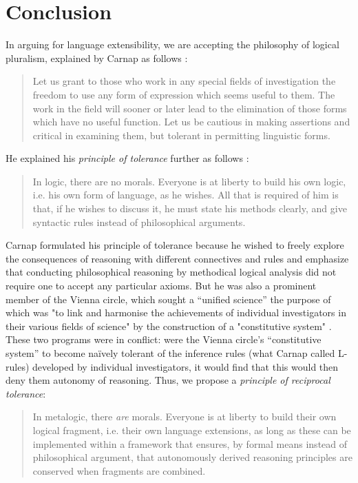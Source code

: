 \section{Conclusion}\label{conclusion}
In arguing for language extensibility, we are accepting the philosophy of logical pluralism, explained by Carnap as follows \cite{carnap:1950b}:
\begin{quote}
Let us grant to those who work in any special fields of investigation the freedom to use any form of expression which seems useful to them. The work in the field will sooner or later lead to the elimination of those forms which have no useful function. Let us be cautious in making assertions and critical in examining them, but tolerant in permitting linguistic forms.
\end{quote}
He explained his \emph{principle of tolerance} further as follows \cite{CarnapR:logsl}:
\begin{quote}
In logic, there are no morals. Everyone is at liberty to build his own logic, i.e. his own form of language, as he wishes. All that is required of him is that, if he wishes to discuss it, he must state his methods clearly, and give syntactic rules instead of philosophical arguments.
\end{quote}

Carnap formulated his principle of tolerance because he wished to freely explore the consequences of reasoning with different connectives and  rules and emphasize that conducting philosophical reasoning by methodical logical analysis did not require one to accept any particular axioms. But he was also a prominent member of the Vienna circle, which sought a ``unified science'' the purpose of which was "to link and harmonise the achievements of individual investigators in their various fields of science" by the construction of a "constitutive system" \cite{hahn1929scientific}. These two programs were in conflict: were the Vienna circle's ``constitutive system'' to become na\"ively tolerant of the inference rules (what Carnap called L-rules) developed by individual investigators, it would find that this would then deny them autonomy of reasoning.%
Thus, we propose a \emph{principle of reciprocal tolerance}:
\begin{quote}
In metalogic, there \emph{are} morals. Everyone is at liberty to build their own logical fragment, i.e. their own language extensions, as long as these can be implemented within a framework that ensures, by formal means instead of philosophical argument, that autonomously derived reasoning principles are conserved when fragments are combined.
\end{quote}

